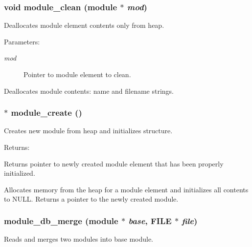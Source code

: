 \subsubsection{\setlength{\rightskip}{0pt plus 5cm}void module\_\-clean ({\bf module} $\ast$ {\em mod})}\label{module_8c_a9}


Deallocates module element contents only from heap.

\begin{Desc}
\item[Parameters: ]\par
\begin{description}
\item[{\em 
mod}]Pointer to module element to clean.\end{description}
\end{Desc}
Deallocates module contents: name and filename strings. 
\subsubsection{$\ast$ module\_\-create ()}\label{module_8c_a2}


Creates new module from heap and initializes structure.

\begin{Desc}
\item[Returns: ]\par
Returns pointer to newly created module element that has been properly initialized.\end{Desc}
Allocates memory from the heap for a module element and initializes all contents to NULL. Returns a pointer to the newly created module. 
\subsubsection{ module\_\-db\_\-merge ({\bf module} $\ast$ {\em base}, FILE $\ast$ {\em file})}\label{module_8c_a6}


Reads and merges two modules into base module.

